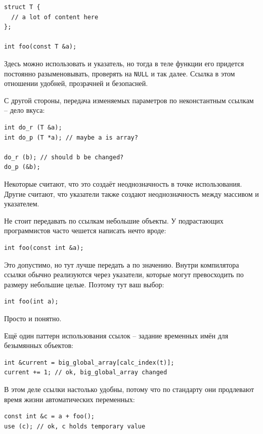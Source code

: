 \documentclass[a4paper,12pt,oneside]{book}
\begin{document}
\begin{lstlisting}
struct T {
  // a lot of content here
};

int foo(const T &a);
\end{lstlisting}

Здесь можно использовать и указатель, но тогда в теле функции его придется постоянно разыменовывать, проверять на \lstinline!NULL! и так далее. Ссылка в этом отношении удобней, прозрачней и безопасней.

С другой стороны, передача изменяемых параметров по неконстантным ссылкам -- дело вкуса:

\begin{lstlisting}
int do_r (T &a);
int do_p (T *a); // maybe a is array?

do_r (b); // should b be changed?
do_p (&b);
\end{lstlisting}

Некоторые считают, что это создаёт неоднозначность в точке использования. Другие считают, что указатели также создают неоднозначность между массивом и указателем.

Не стоит передавать по ссылкам небольшие объекты. У подрастающих программистов часто чешется написать нечто вроде:

\begin{lstlisting}
int foo(const int &a);
\end{lstlisting}

Это допустимо, но тут лучше передать \lstinline!a! по значению. Внутри компилятора ссылки обычно реализуются через указатели, которые могут превосходить по размеру небольшие целые. Поэтому тут ваш выбор:

\begin{lstlisting}
int foo(int a);
\end{lstlisting}

Просто и понятно.

Ещё один паттерн использования ссылок -- задание временных имён для безымянных объектов:

\begin{lstlisting}
int &current = big_global_array[calc_index(t)];
current += 1; // ok, big_global_array changed
\end{lstlisting}

В этом деле ссылки настолько удобны, потому что по стандарту они продлевают время жизни автоматических переменных:

\begin{lstlisting}
const int &c = a + foo();
use (c); // ok, c holds temporary value
\end{lstlisting}
\end{document}
